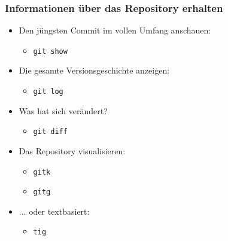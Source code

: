 \documentclass{beamer}
\begin{document}
\begin{frame}
 \frametitle{Informationen über das Repository erhalten}



\begin{itemize}

	\item[] Den jüngsten Commit im vollen Umfang anschauen:
	\begin{itemize}
		\item \texttt{git show}
	\end{itemize}

	\item[] Die gesamte Versionsgeschichte anzeigen:
	\begin{itemize}
		\item \texttt{git log}
	\end{itemize}

	\item[]  Was hat sich verändert?
	\begin{itemize}
		\item \texttt{git diff}
	\end{itemize}

	\item[] Das Repository visualisieren:
	\begin{itemize}
		\item \texttt{gitk}
		\item \texttt{gitg}
	\end{itemize}

	\item[] ... oder textbasiert:
	\begin{itemize}
		\item \texttt{tig}
	\end{itemize}

\end{itemize}


 \end{frame}
\end{document}
